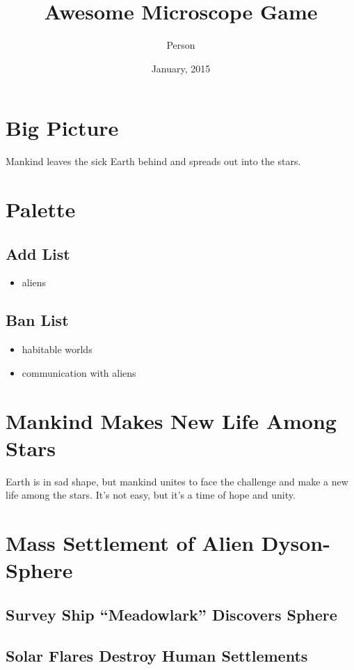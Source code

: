 \documentclass[letterpaper,twoside,openany]{book}
\title{Awesome Microscope Game}
\author{Person}
\date{January, 2015}
\newcommand{\light}{\textopenbullet}
\newcommand{\dark}{\textbullet}
\begin{document}
\frontmatter
\maketitle

\tableofcontents

\chapter{Big Picture}
Mankind leaves the sick Earth behind and spreads out into the stars.

\chapter{Palette}
\section*{Add List}
\begin{itemize}
	\item
		aliens
\end{itemize}
\section*{Ban List}
\begin{itemize}
	\item
		habitable worlds
	\item
		communication with aliens
\end{itemize}

\mainmatter

\chapter{Mankind Makes New Life Among Stars \light}
Earth is in sad shape, but mankind unites to face the challenge and make a new life among the stars.
It's not easy, but it's a time of hope and unity.

\chapter{Mass Settlement of Alien Dyson-Sphere \light}

\section{Survey Ship ``Meadowlark'' Discovers Sphere \light}

\section{Solar Flares Destroy Human Settlements \dark}
\end{document}
